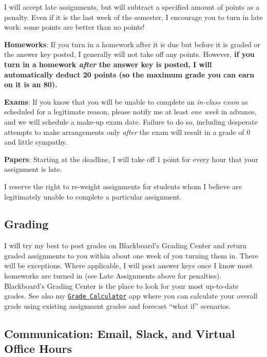 \documentclass{article}
\begin{document}
I will accept late assignments, but will subtract a specified amount of
points as a penalty. Even if it is the last week of the semester, I
encourage you to turn in late work: some points are better than no
points!

\textbf{Homeworks}: If you turn in a homework after it is due but before
it is graded or the answer key posted, I generally will not take off any
points. However, \textbf{if you turn in a homework \emph{after} the
answer key is posted, I will automatically deduct 20 points (so the
maximum grade you can earn on it is an 80).}

\textbf{Exams}: If you know that you will be unable to complete an
\emph{in-class exam} as scheduled for a legitimate reason, please notify
me at least \emph{one week} in advance, and we will schedule a make-up
exam date. Failure to do so, including desperate attempts to make
arrangements only \emph{after} the exam will result in a grade of 0 and
little sympathy.

\textbf{Papers}: Starting at the deadline, I will take off 1 point for
every hour that your assignment is late.

I reserve the right to re-weight assignments for students whom I believe
are legitimately unable to complete a particular assignment.

\hypertarget{grading}{%
\subsection{Grading}\label{grading}}

I will try my best to post grades on Blackboard's Grading Center and
return graded assignments to you within about one week of you turning
them in. There will be exceptions. Where applicable, I will post answer
keys once I know most homeworks are turned in (see Late Assignments
above for penalties). Blackboard's Grading Center is the place to look
for your most up-to-date grades. See also my
\href{https://ryansafner.shinyapps.io/game_grade_calculator/}{
\texttt{Grade\ Calculator}} app where you can calculate your overall
grade using existing assignment grades and forecast ``what if''
scenarios.

\hypertarget{communication-email-slack-and-virtual-office-hours}{%
\subsection{Communication: Email, Slack, and Virtual Office
Hours}\label{communication-email-slack-and-virtual-office-hours}}
\end{document}
